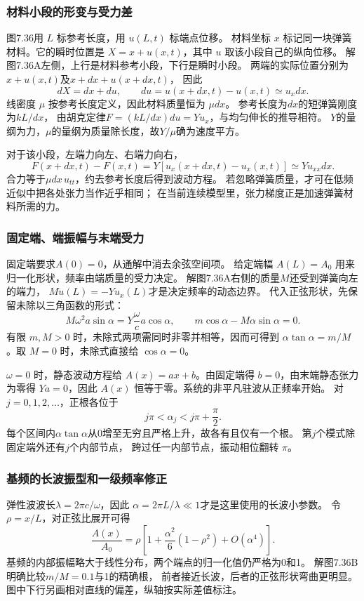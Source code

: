 \documentclass[UTF8,fontset=fandol,a4paper,11pt]{ctexart}
\begin{document}
\subsubsection*{材料小段的形变与受力差}
图7.36用 $L$ 标参考长度，用 $u(L,t)$ 标端点位移。
材料坐标 $x$ 标记同一块弹簧材料。它的瞬时位置是 $X=x+u(x,t)$，其中 $u$ 取该小段自己的纵向位移。
解图7.36A左侧，上行是材料参考小段，下行是瞬时小段。
两端的实际位置分别为$x+u(x,t)$及$x+dx+u(x+dx,t)$，
因此
\[
dX=dx+du,\qquad du=u(x+dx,t)-u(x,t)\simeq u_xdx.
\]
线密度 $\mu$ 按参考长度定义，因此材料质量恒为 $\mu dx$。
参考长度为$dx$的短弹簧刚度为$kL/dx$，
由胡克定律$F=(kL/dx)du=Yu_x$，与均匀伸长的推导相符。
$Y$的量纲为力，$\mu$的量纲为质量除长度，故$Y/\mu$确为速度平方。

对于该小段，左端力向左、右端力向右，
\[
F(x+dx,t)-F(x,t)
=Y[u_x(x+dx,t)-u_x(x,t)]\simeq Yu_{xx}dx.
\]
合力等于$\mu dx\,u_{tt}$，约去参考长度后得到波动方程。
若忽略弹簧质量，才可在低频近似中把各处张力当作近乎相同；
在当前连续模型里，张力梯度正是加速弹簧材料所需的力。

\subsubsection*{固定端、端振幅与末端受力}
固定端要求$A(0)=0$，从通解中消去余弦空间项。
给定端幅 $A(L)=A_0$ 用来归一化形状，频率由端质量的受力决定。
解图7.36A右侧的质量$M$还受到弹簧向左的端力，
$M\ddot u(L)=-Yu_x(L)$才是决定频率的动态边界。
代入正弦形状，先保留未除以三角函数的形式：
\[
M\omega^2a\sin\alpha=Y\frac\omega c a\cos\alpha,
\qquad m\cos\alpha-M\alpha\sin\alpha=0.
\]
有限 $m,M>0$ 时，未除式两项需同时非零并相等，因而可得到 $\alpha\tan\alpha=m/M$。取 $M=0$ 时，未除式直接给 $\cos\alpha=0$。

$\omega=0$ 时，静态波动方程给 $A(x)=ax+b$。由固定端得 $b=0$，由末端静态张力为零得 $Ya=0$，因此 $A(x)$ 恒等于零。系统的非平凡驻波从正频率开始。
对$j=0,1,2,\ldots$，正根各位于
\[
j\pi<\alpha_j<j\pi+\frac\pi2.
\]
每个区间内$\alpha\tan\alpha$从0增至无穷且严格上升，故各有且仅有一个根。
第$j$个模式除固定端外还有$j$个内部节点，
跨过任一内部节点，振动相位翻转 $\pi$。

\subsubsection*{基频的长波振型和一级频率修正}
弹性波波长$\lambda=2\pi c/\omega$，因此
$\alpha=2\pi L/\lambda\ll1$才是这里使用的长波小参数。
令$\rho=x/L$，对正弦比展开可得
\[
\frac{A(x)}{A_0}=\rho\left[1+\frac{\alpha^2}{6}(1-\rho^2)
+O(\alpha^4)\right].
\]
基频的内部振幅略大于线性分布，两个端点的归一化值仍严格为0和1。
解图7.36B明确比较$m/M=0.1$与1的精确根，
前者接近长波，后者的正弦形状弯曲更明显。
图中下行另画相对直线的偏差，纵轴按实际差值标注。
\end{document}
